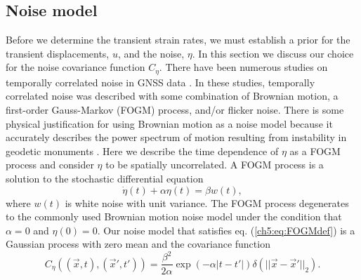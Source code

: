 \subsection{Noise model}\label{ch5:sec:NoiseModel}
Before we determine the transient strain rates, we must establish a prior for the transient displacements, $u$, and the noise, $\eta$. In this section we discuss our choice for the noise covariance function $C_\eta$. There have been numerous studies on temporally correlated noise in GNSS data \citep[e.g.,][]{Zhang1997,Mao1999,Williams2004,Langbein2008}. In these studies, temporally correlated noise was described with some combination of Brownian motion, a first-order Gauss-Markov (FOGM) process, and/or flicker noise. There is some physical justification for using Brownian motion as a noise model because it accurately describes the power spectrum of motion resulting from instability in geodetic monuments \citep[e.g.,][]{Wyatt1982,Wyatt1989}. Here we describe the time dependence of $\eta$ as a FOGM process and consider $\eta$ to be spatially uncorrelated. A FOGM process is a solution to the stochastic differential equation
\begin{equation}\label{ch5:eq:FOGMdef}
\dot{\eta}(t) + \alpha \eta(t) = \beta w(t),
\end{equation}
where $w(t)$ is white noise with unit variance. The FOGM process degenerates to the commonly used Brownian motion noise model under the condition that $\alpha=0$ and $\eta(0) = 0$. Our noise model that satisfies eq. (\ref{ch5:eq:FOGMdef}) is a Gaussian process with zero mean and the covariance function
\begin{equation}\label{ch5:eq:FOGM}
C_\eta\left((\vec{x},t),(\vec{x}',t')\right) = \frac{\beta^2}{2\alpha}\exp\left(-\alpha|t - t'|\right) \delta(||\vec{x} - \vec{x}'||_2). 
\end{equation}

